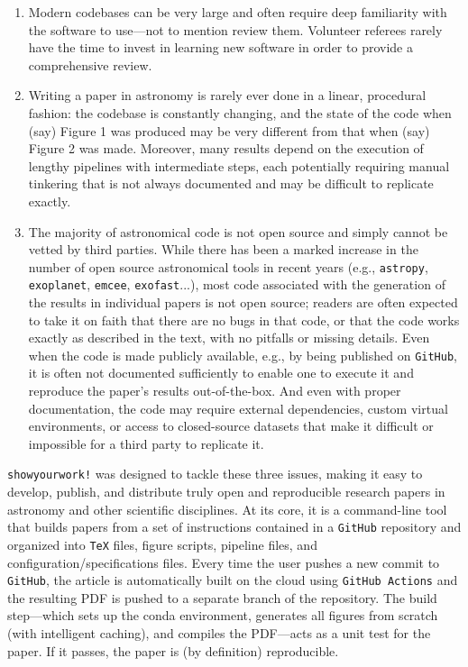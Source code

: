 \documentclass[modern]{aastex631}
\begin{document}
\begin{enumerate}
    \item Modern codebases can be very large and often require deep familiarity with the software to use---not to mention review them. Volunteer referees rarely have the time to invest in learning new software in order to provide a comprehensive review.
    \item  Writing a paper in astronomy is rarely ever done in a linear, procedural fashion: the codebase is constantly changing, and the state of the code when (say) Figure 1 was produced may be very different from that when (say) Figure 2 was made. 
    Moreover, many results depend on the execution of lengthy pipelines with intermediate steps, each potentially requiring manual tinkering that is not always documented and may be difficult to replicate exactly.
    \item The majority of astronomical code is not open source and simply cannot be vetted by third parties. 
    While there has been a marked increase in the number of open source astronomical tools in recent years (e.g., \texttt{astropy}, \texttt{exoplanet}, \texttt{emcee}, \texttt{exofast}...), most code associated with the generation of the results in individual papers is not open source; readers are often expected to take it on faith that there are no bugs in that code, or that the code works exactly as described in the text, with no pitfalls or missing details. 
    Even when the code is made publicly available, e.g., by being published on \texttt{GitHub}, it is often not documented sufficiently to enable one to execute it and reproduce the paper's results out-of-the-box. 
    And even with proper documentation, the code may require external dependencies, custom virtual environments, or access to closed-source datasets that make it difficult or impossible for a third party to replicate it.
\end{enumerate}

\texttt{showyourwork!} was designed to tackle these three issues, making it easy to develop, publish, and distribute truly open and reproducible research papers in astronomy and other scientific disciplines. 
At its core, it is a command-line tool that builds papers from a set of instructions contained in a \texttt{GitHub} repository and organized into \texttt{TeX} files, figure scripts, pipeline files, and configuration/specifications files.
Every time the user pushes a new commit to \texttt{GitHub}, the article is automatically built on the cloud using \texttt{GitHub Actions} and the resulting PDF is pushed to a separate branch of the repository. 
The build step---which sets up the conda environment, generates all figures from scratch (with intelligent caching), and compiles the PDF---acts as a unit test for the paper. 
If it passes, the paper is (by definition) reproducible.
\end{document}
